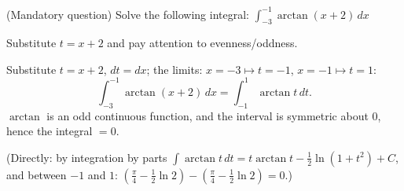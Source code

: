 
\begin{question}
(Mandatory question)
Solve the following integral:
$\displaystyle\int_{-3}^{-1}\arctan(x+2)\,dx$
\end{question}

\begin{hint}
Substitute $t=x+2$ and pay attention to evenness/oddness.
\end{hint}

\begin{solution}
Substitute $t=x+2$, $dt=dx$; the limits: $x=-3\mapsto t=-1$, $x=-1\mapsto t=1$:
\[ \int_{-3}^{-1}\arctan(x+2)\,dx=\int_{-1}^{1}\arctan t\,dt. \]
$\arctan$ is an odd continuous function, and the interval is symmetric about $0$, hence the integral $\boxed{=0}$.

(Directly: by integration by parts $\int\arctan t\,dt=t\arctan t-\frac12\ln(1+t^2)+C$, and between $-1$ and $1$: $\left(\frac\pi4-\frac12\ln2\right)-\left(\frac\pi4-\frac12\ln2\right)=0$.)
\end{solution}
